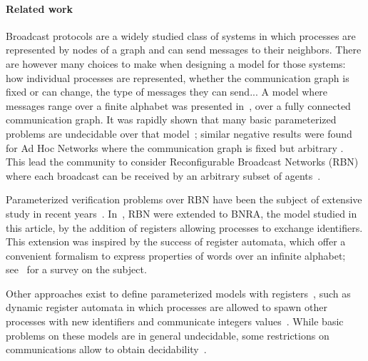 \paragraph*{Related work} 
Broadcast protocols are a widely studied class of systems in which processes are represented by nodes of a graph and can send messages to their neighbors. There are however many choices to make when designing a model for those systems: how individual processes are represented, whether the communication graph is fixed or can change, the type of messages they can send... 
A model where messages range over a finite alphabet was presented in~\cite{emerson1998model}, over a fully connected communication graph. It was rapidly shown that many basic parameterized problems are undecidable over that model~\cite{EsparzaFM1999verification}; similar negative results were found for Ad Hoc Networks where the communication graph is fixed but arbitrary \cite{DelzannoSZ2010Adhoc}. This lead the community to consider Reconfigurable Broadcast Networks (RBN) where each broadcast can be received by an arbitrary subset of agents~\cite{DelzannoSZ2010Adhoc}.

Parameterized verification problems over RBN have been the subject of extensive study in recent years~\cite{DelzannoSTZ12, Balasubramanian18, BalasubramanianGW22, DBLP:journals/computing/ChiniMS22}. In~\cite{DelzannoST13}, RBN were extended to BNRA, the model studied in this article, by the addition of registers allowing processes to exchange identifiers. This extension was inspired by the success of register automata, which offer a convenient formalism to express properties of words over an infinite alphabet; see~\cite{Segoufin06} for a survey on the subject.

Other approaches exist to define parameterized models with registers~\cite{BolligRS21}, such as dynamic register automata in which processes are allowed to spawn other processes with new identifiers and communicate integers values~\cite{AbdullaAKR14}. While basic problems on these models are in general undecidable, some restrictions on communications allow to obtain decidability~\cite{AbdullaAKR15, Rezine17}.

